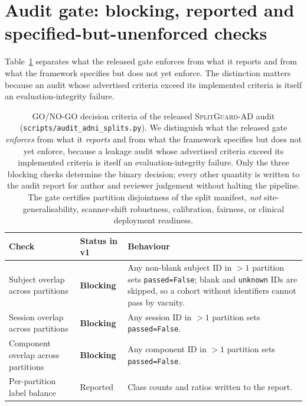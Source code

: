 \documentclass[11pt]{article}
\newcommand{\SGA}{\textsc{SplitGuard-AD}}
\providecommand{\pb}{\discretionary{}{}{}}
\begin{document}
\section{Audit gate: blocking, reported and specified-but-unenforced checks}

Table~\ref{tab:go_nogo} separates what the released gate enforces from what it reports and from what the framework specifies but does not yet enforce. The distinction matters because an audit whose advertised criteria exceed its implemented criteria is itself an evaluation-integrity failure.

\begin{table}[!ht]
\centering
\footnotesize
\caption{GO/NO-GO decision criteria of the released \SGA{} audit
(\texttt{scripts/\pb audit\_adni\_splits.py}). We distinguish what the
released gate \emph{enforces} from what it \emph{reports} and from what
the framework specifies but does not yet enforce, because a leakage
audit whose advertised criteria exceed its implemented criteria is
itself an evaluation-integrity failure. Only the three blocking
checks determine the binary decision; every other quantity is written
to the audit report for author and reviewer judgement without halting
the pipeline. The gate certifies partition disjointness of the split
manifest, \emph{not} site-generalisability, scanner-shift robustness,
calibration, fairness, or clinical deployment readiness.}
\label{tab:go_nogo}
\setlength{\tabcolsep}{4pt}
\begin{tabular}{>{\raggedright\arraybackslash}p{3.9cm}>{\raggedright\arraybackslash}p{2.1cm}>{\raggedright\arraybackslash}p{5.8cm}}
\toprule
\textbf{Check} & \textbf{Status in v1} & \textbf{Behaviour} \\
\midrule
Subject overlap across partitions & \textbf{Blocking} & Any non-blank subject ID in $>1$ partition sets \texttt{passed=False}; blank and \texttt{unknown} IDs are skipped, so a cohort without identifiers cannot pass by vacuity. \\
Session overlap across partitions & \textbf{Blocking} & Any session ID in $>1$ partition sets \texttt{passed=False}. \\
Component overlap across partitions & \textbf{Blocking} & Any component ID in $>1$ partition sets \texttt{passed=False}. \\
\midrule
Per-partition label balance & Reported & Class counts and ratios written to the report. \\

\end{tabular}
\end{table}
\end{document}
